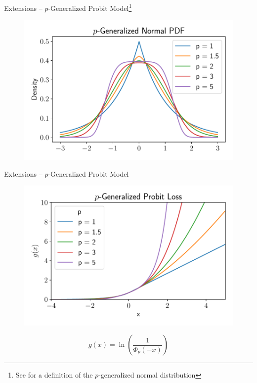 \documentclass[gray]{beamer}
\begin{document}
\begin{frame}{Extensions -- $p$-Generalized Probit
        Model\footnote{See \cite{KalkeR13} for a definition of the $p$-generalized normal distribution}}
    \begin{figure}[ht!]
        \centering
        \includegraphics[width=\linewidth]{../figures/p_gen_pdf.pdf}
    \end{figure}
\end{frame}

\begin{frame}{Extensions -- $p$-Generalized Probit Model}
    \begin{figure}[ht!]
        \centering
        \includegraphics[width=\linewidth]{../figures/probit_loss_p.pdf}
    \end{figure}
    \begin{equation*}
        g(x) = \ln\left(\frac{1}{\Phi_p(-x)}\right)
    \end{equation*}
\end{frame}
\end{document}

